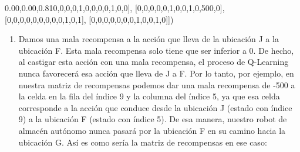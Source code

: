 \documentclass[
]{book}
\newenvironment{Shaded}{\begin{snugshade}}{\end{snugshade}}
\newcommand{\DecValTok}[1]{\textcolor[rgb]{0.00,0.00,0.81}{#1}}
\newcommand{\NormalTok}[1]{#1}
\providecommand{\tightlist}{%
  \setlength{\itemsep}{0pt}\setlength{\parskip}{0pt}}
\begin{document}
\begin{Shaded}
\begin{Highlighting}[]
\NormalTok{          [}\DecValTok{0}\NormalTok{,}\DecValTok{0}\NormalTok{,}\DecValTok{0}\NormalTok{,}\DecValTok{0}\NormalTok{,}\DecValTok{1}\NormalTok{,}\DecValTok{0}\NormalTok{,}\DecValTok{0}\NormalTok{,}\DecValTok{0}\NormalTok{,}\DecValTok{0}\NormalTok{,}\DecValTok{1}\NormalTok{,}\DecValTok{0}\NormalTok{,}\DecValTok{0}\NormalTok{],}
\NormalTok{          [}\DecValTok{0}\NormalTok{,}\DecValTok{0}\NormalTok{,}\DecValTok{0}\NormalTok{,}\DecValTok{0}\NormalTok{,}\DecValTok{0}\NormalTok{,}\DecValTok{1}\NormalTok{,}\DecValTok{0}\NormalTok{,}\DecValTok{0}\NormalTok{,}\DecValTok{1}\NormalTok{,}\DecValTok{0}\NormalTok{,}\DecValTok{500}\NormalTok{,}\DecValTok{0}\NormalTok{],}
\NormalTok{          [}\DecValTok{0}\NormalTok{,}\DecValTok{0}\NormalTok{,}\DecValTok{0}\NormalTok{,}\DecValTok{0}\NormalTok{,}\DecValTok{0}\NormalTok{,}\DecValTok{0}\NormalTok{,}\DecValTok{0}\NormalTok{,}\DecValTok{0}\NormalTok{,}\DecValTok{0}\NormalTok{,}\DecValTok{1}\NormalTok{,}\DecValTok{0}\NormalTok{,}\DecValTok{1}\NormalTok{],}
\NormalTok{          [}\DecValTok{0}\NormalTok{,}\DecValTok{0}\NormalTok{,}\DecValTok{0}\NormalTok{,}\DecValTok{0}\NormalTok{,}\DecValTok{0}\NormalTok{,}\DecValTok{0}\NormalTok{,}\DecValTok{0}\NormalTok{,}\DecValTok{1}\NormalTok{,}\DecValTok{0}\NormalTok{,}\DecValTok{0}\NormalTok{,}\DecValTok{1}\NormalTok{,}\DecValTok{0}\NormalTok{]])}
\end{Highlighting}
\end{Shaded}

\begin{enumerate}
\def\labelenumi{\arabic{enumi}.}
\setcounter{enumi}{1}
\tightlist
\item
  Damos una mala recompensa a la acción que lleva de la ubicación J a la ubicación F. Esta mala recompensa solo tiene que ser inferior a 0. De hecho, al castigar esta acción con una mala recompensa, el proceso de Q-Learning nunca favorecerá esa acción que lleva de J a F. Por lo tanto, por ejemplo, en nuestra matriz de recompensas podemos dar una mala recompensa de -500 a la celda en la fila del índice 9 y la columna del índice 5, ya que esa celda corresponde a la acción que conduce desde la ubicación J (estado con índice 9) a la ubicación F (estado con índice 5). De esa manera, nuestro robot de almacén autónomo nunca pasará por la ubicación F en su camino hacia la ubicación G. Así es como sería la matriz de recompensas en ese caso:
\end{enumerate}
\end{document}
